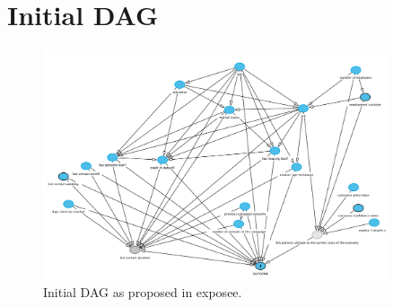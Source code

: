 \documentclass[11pt]{article}
\begin{document}
\section{Initial DAG}
\label{sec:initial_dag}
\begin{figure}[h]
	\centering
	\includegraphics[width=0.9\textwidth]{images/initial_dag}
	\caption{Initial DAG as proposed in exposee.}
	\label{fig:initial_dag}
\end{figure}
\end{document}
